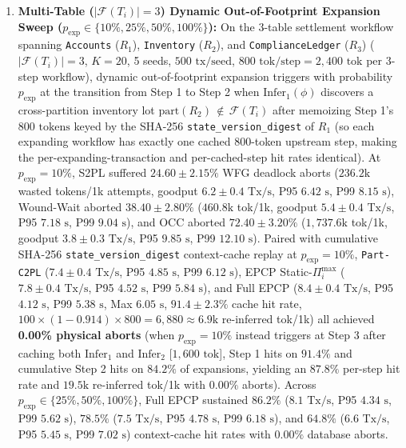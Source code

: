 \documentclass[conference,10pt]{IEEEtran}
\begin{document}
\begin{enumerate}
    \item \textbf{Multi-Table ($|\mathcal{F}(T_i)| = 3$) Dynamic Out-of-Footprint Expansion Sweep ($p_{\text{exp}} \in \{10\%, 25\%, 50\%, 100\%\}$):} On the 3-table settlement workflow spanning \texttt{Accounts} ($R_1$), \texttt{Inventory} ($R_2$), and \texttt{ComplianceLedger} ($R_3$) ($|\mathcal{F}(T_i)| = 3$, $K=20$, 5 seeds, $500\text{ tx/seed}$, $800\text{ tok/step} = 2{,}400\text{ tok}$ per 3-step workflow), dynamic out-of-footprint expansion triggers with probability $p_{\text{exp}}$ at the transition from Step 1 to Step 2 when $\text{Infer}_1(\phi)$ discovers a cross-partition inventory lot $\text{part}(R_2) \,\notin\, \mathcal{F}(T_i)$ after memoizing Step 1's $800\text{ tokens}$ keyed by the SHA-256 \texttt{state\_version\_digest} of $R_1$ (so each expanding workflow has exactly one cached $800$-token upstream step, making the per-expanding-transaction and per-cached-step hit rates identical). At $p_{\text{exp}} = 10\%$, S2PL suffered $24.60 \pm 2.15\%$ WFG deadlock aborts ($236.2\text{k}$ wasted tokens/1k attempts, goodput $6.2 \pm 0.4\text{ Tx/s}$, P95 $6.42\text{ s}$, P99 $8.15\text{ s}$), Wound-Wait aborted $38.40 \pm 2.80\%$ ($460.8\text{k}$ tok/1k, goodput $5.4 \pm 0.4\text{ Tx/s}$, P95 $7.18\text{ s}$, P99 $9.04\text{ s}$), and OCC aborted $72.40 \pm 3.20\%$ ($1{,}737.6\text{k}$ tok/1k, goodput $3.8 \pm 0.3\text{ Tx/s}$, P95 $9.85\text{ s}$, P99 $12.10\text{ s}$). Paired with cumulative SHA-256 \texttt{state\_\allowbreak version\_\allowbreak digest} context-cache replay at $p_{\text{exp}}=10\%$, \texttt{Part-C2PL} ($7.4 \pm 0.4\text{ Tx/s}$, P95 $4.85\text{ s}$, P99 $6.12\text{ s}$), EPCP Static-$\Pi_i^{\max}$ ($7.8 \pm 0.4\text{ Tx/s}$, P95 $4.52\text{ s}$, P99 $5.84\text{ s}$), and Full EPCP ($8.4 \pm 0.4\text{ Tx/s}$, P95 $4.12\text{ s}$, P99 $5.38\text{ s}$, Max $6.05\text{ s}$, $91.4 \pm 2.3\%$ cache hit rate, $100\times (1-0.914)\times 800 = 6{,}880 \approx 6.9\text{k}$ re-inferred tok/1k) all achieved \textbf{0.00\% physical aborts} (when $p_{\text{exp}}=10\%$ instead triggers at Step 3 after caching both $\text{Infer}_1$ and $\text{Infer}_2$ [$1{,}600\text{ tok}$], Step 1 hits on $91.4\%$ and cumulative Step 2 hits on $84.2\%$ of expansions, yielding an $87.8\%$ per-step hit rate and $19.5\text{k}$ re-inferred tok/1k with $0.00\%$ aborts). Across $p_{\text{exp}} \in \{25\%, 50\%, 100\%\}$, Full EPCP sustained $86.2\%$ ($8.1\text{ Tx/s}$, P95 $4.34\text{ s}$, P99 $5.62\text{ s}$), $78.5\%$ ($7.5\text{ Tx/s}$, P95 $4.78\text{ s}$, P99 $6.18\text{ s}$), and $64.8\%$ ($6.6\text{ Tx/s}$, P95 $5.45\text{ s}$, P99 $7.02\text{ s}$) context-cache hit rates with $0.00\%$ database aborts.

\end{enumerate}
\end{document}
